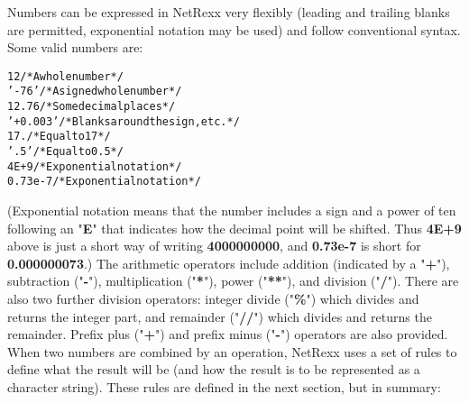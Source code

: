 Numbers can be expressed in NetRexx very flexibly (leading and trailing
blanks are permitted, exponential notation may be used) and follow
conventional syntax.
Some valid numbers are:
\begin{alltt}
     12          /* A whole number               */
   '-76'         /* A signed whole number        */
     12.76       /* Some decimal places          */
 ' +  0.003 '    /* Blanks around the sign, etc. */
     17.         /* Equal to 17                  */
      '.5'       /* Equal to 0.5                 */
     4E+9        /* Exponential notation         */
      0.73e-7    /* Exponential notation         */
\end{alltt}
(Exponential notation means that the number includes a sign and a power
of ten following an "\textbf{E}" that indicates how the decimal
point will be shifted.  Thus \textbf{4E+9} above is just a short way
of writing \textbf{4000000000}, and \textbf{0.73e-7} is short
for \textbf{0.000000073}.)
 The arithmetic operators include
addition (indicated by a "\textbf{+}"),
subtraction ("\textbf{-}"),
multiplication ("\textbf{*}"),
power ("\textbf{**}"), and
division ("\textbf{/}").
There are also two further division operators:
integer divide ("\textbf{\%}") which divides and returns the integer part, and
remainder ("\textbf{//}") which divides and returns the remainder.
Prefix plus ("\textbf{+}") and
prefix minus ("\textbf{-}") operators are also provided.
 When two numbers are combined by an operation, NetRexx uses a set of
rules to define what the result will be (and how the result is to be
represented as a character string).
These rules are defined in the next section, but in summary:
